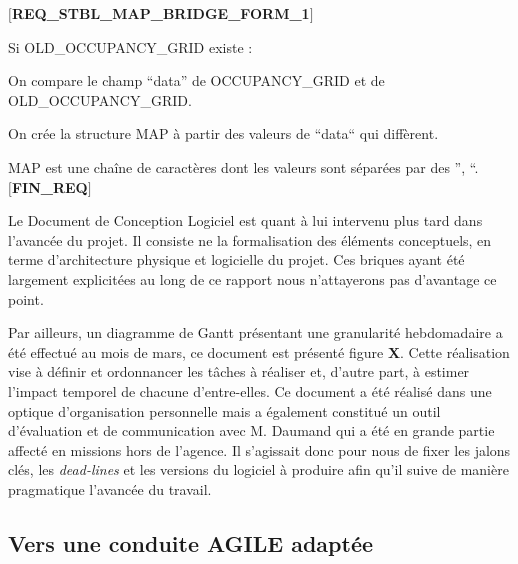   \textbf{$[$REQ\_STBL\_MAP\_BRIDGE\_FORM\_1$]$}
  
    \hspace{10mm} Si OLD\_OCCUPANCY\_GRID existe : 
    
    \hspace{10mm} On compare le champ ``data'' de OCCUPANCY\_GRID et de OLD\_OCCUPANCY\_GRID. 
    
    \hspace{10mm} On crée la structure MAP à partir des valeurs de ``data`` qui diffèrent. 
    
    \hspace{10mm} MAP est une chaîne de caractères dont les valeurs sont séparées par des '', ``.\\ 
  \textbf{$[$FIN\_REQ$]$}
  
  Le Document de Conception Logiciel est quant à lui intervenu plus tard dans l'avancée du projet. 
  Il consiste ne la formalisation des éléments conceptuels, en terme d'architecture physique et logicielle du projet. 
  Ces briques ayant été largement explicitées au long de ce rapport nous n'attayerons pas d'avantage ce point. 
  
  Par ailleurs, un diagramme de Gantt présentant une granularité hebdomadaire a été effectué au mois de mars, ce document est présenté figure \textbf{X}.
  Cette réalisation vise à définir et ordonnancer les tâches à réaliser et, d'autre part, à estimer l'impact temporel de chacune d'entre-elles. 
  Ce document a été réalisé dans une optique d'organisation personnelle mais a également constitué un outil d'évaluation et de communication avec M. Daumand qui a été en grande partie affecté en missions hors de l'agence. 
  Il s'agissait donc pour nous de fixer les jalons clés, les \emph{dead-lines} et les versions du logiciel à produire afin qu'il suive de manière pragmatique l'avancée du travail. 
  
  \subsection{Vers une conduite AGILE adaptée}
  
